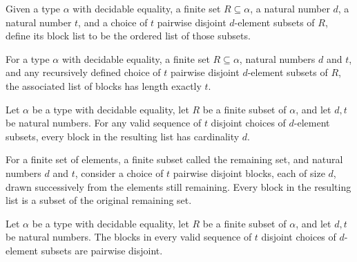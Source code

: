 \begin{definition}
\label{FABL.DisjointBlockChoices.blocks}
\leanok
{}
Given a type $\alpha$ with decidable equality, a finite set $R\subseteq\alpha$, a
natural number $d$, a natural number $t$, and a choice of $t$ pairwise disjoint
$d$-element subsets of $R$, define its block list to be the ordered list of those
subsets.
\end{definition}

\begin{theorem}
\label{FABL.DisjointBlockChoices.blocks_length}
\leanok
{}
For a type $\alpha$ with decidable equality, a finite set $R \subseteq \alpha$, natural
numbers $d$ and $t$, and any recursively defined choice of $t$ pairwise disjoint
$d$-element subsets of $R$, the associated list of blocks has length exactly $t$.
\end{theorem}

\begin{theorem}
\label{FABL.DisjointBlockChoices.blocks_card}
\leanok
{}
Let $\alpha$ be a type with decidable equality, let $R$ be a finite subset of $\alpha$,
and let $d,t$ be natural numbers. For any valid sequence of $t$ disjoint choices of
$d$-element subsets, every block in the resulting list has cardinality $d$.
\end{theorem}

\begin{theorem}
\label{FABL.DisjointBlockChoices.blocks_subset}
\leanok
{}
For a finite set of elements, a finite subset called the remaining set, and natural
numbers $d$ and $t$, consider a choice of $t$ pairwise disjoint blocks, each of size
$d$, drawn successively from the elements still remaining. Every block in the resulting
list is a subset of the original remaining set.
\end{theorem}

\begin{theorem}
\label{FABL.DisjointBlockChoices.blocks_pairwiseDisjoint}
\leanok
{}
Let $\alpha$ be a type with decidable equality, let $R$ be a finite subset of $\alpha$,
and let $d,t$ be natural numbers. The blocks in every valid sequence of $t$ disjoint
choices of $d$-element subsets are pairwise disjoint.
\end{theorem}

